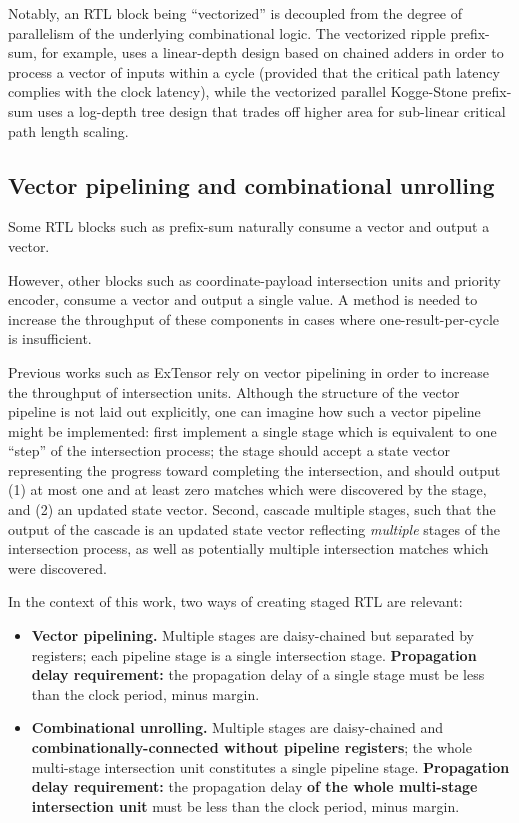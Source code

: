 Notably, an RTL block being ``vectorized'' is decoupled from the degree of parallelism of the underlying combinational logic. The vectorized ripple prefix-sum, for example, uses a linear-depth design based on chained adders in order to process a vector of inputs within a cycle (provided that the critical path latency complies with the clock latency), while the vectorized parallel Kogge-Stone\cite{koggestone} prefix-sum uses a log-depth tree design that trades off higher area for sub-linear critical path length scaling.

\subsection{Vector pipelining and combinational unrolling}

Some RTL blocks such as prefix-sum naturally consume a vector and output a vector.

However, other blocks such as coordinate-payload intersection units and priority encoder, consume a vector and output a single value. A method is needed to increase the throughput of these components in cases where one-result-per-cycle is insufficient.

Previous works such as ExTensor\cite{extensor} rely on vector pipelining in order to increase the throughput of intersection units. Although the structure of the vector pipeline is not laid out explicitly, one can imagine how such a vector pipeline might be implemented: first implement a single stage which is equivalent to one ``step'' of the intersection process; the stage should accept a state vector representing the progress toward completing the intersection, and should output (1) at most one and at least zero matches which were discovered by the stage, and (2) an updated state vector. Second, cascade multiple stages, such that the output of the cascade is an updated state vector reflecting \textit{multiple} stages of the intersection process, as well as potentially multiple intersection matches which were discovered.

In the context of this work, two ways of creating staged RTL are relevant:

\begin{itemize}
    \item \textbf{Vector pipelining.} Multiple stages are daisy-chained but separated by registers; each pipeline stage is a single intersection stage. \textbf{Propagation delay requirement:} the propagation delay of a single stage must be less than the clock period, minus margin.
    \item \textbf{Combinational unrolling.} Multiple stages are daisy-chained and \textbf{combinationally-connected without pipeline registers}; the whole multi-stage intersection unit constitutes a single pipeline stage. \textbf{Propagation delay requirement:} the propagation delay \textbf{of the whole multi-stage intersection unit} must be less than the clock period, minus margin.
\end{itemize}

